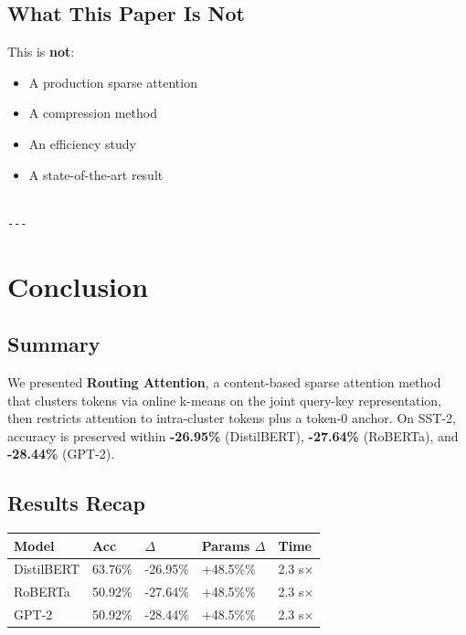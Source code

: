 \subsection{What This Paper Is Not}

This is \textbf{not}:
\begin{itemize}
\item A production sparse attention
\item A compression method
\item An efficiency study
\item A state-of-the-art result
\end{itemize}
\begin{lstlisting}

---
\end{lstlisting}


\section{Conclusion}

\subsection{Summary}

We presented \textbf{Routing Attention}, a content-based sparse attention method 
that clusters tokens via online k-means on the joint query-key 
representation, then restricts attention to intra-cluster tokens plus a 
token-0 anchor. On SST-2, accuracy is preserved within \textbf{-26.95\%} 
(DistilBERT), \textbf{-27.64\%} (RoBERTa), and \textbf{-28.44\%} (GPT-2).

\subsection{Results Recap}

\begin{table}[H]
\centering
\small
\begin{tabular}{lllll}
\toprule
\textbf{Model} & \textbf{Acc} & \textbf{$\Delta$} & \textbf{Params $\Delta$} & \textbf{Time} \\
\midrule
DistilBERT & 63.76\% & -26.95\% & +48.5\%\% & 2.3 s$\times$ \\
RoBERTa & 50.92\% & -27.64\% & +48.5\%\% & 2.3 s$\times$ \\
GPT-2 & 50.92\% & -28.44\% & +48.5\%\% & 2.3 s$\times$ \\
\bottomrule
\end{tabular}
\end{table}

